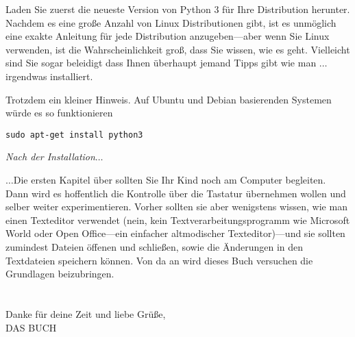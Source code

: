 \begin{LINUX}

\noindent
Laden Sie zuerst die neueste Version von Python 3 für Ihre Distribution herunter. Nachdem es eine große Anzahl von Linux Distributionen gibt, ist es unmöglich eine exakte Anleitung für jede Distribution anzugeben---aber wenn Sie Linux verwenden, ist die Wahrscheinlichkeit groß, dass Sie wissen, wie es geht. Vielleicht sind Sie sogar beleidigt dass Ihnen überhaupt jemand Tipps gibt wie man \texorpdfstring{$\ldots$}{...}irgendwas installiert.

\noindent
Trotzdem ein kleiner Hinweis. Auf Ubuntu und Debian basierenden Systemen würde es so funktionieren

\begin{listing}
\begin{verbatim}
sudo apt-get install python3
\end{verbatim}
\end{listing}
\end{LINUX}

\noindent
\emph{\color{BrickRed}Nach der Installation\texorpdfstring{$\ldots$}{...}}

\noindent
\texorpdfstring{$\ldots$}{...}Die ersten Kapitel über sollten Sie Ihr Kind noch am Computer begleiten. Dann wird es hoffentlich die Kontrolle über die Tastatur übernehmen wollen und selber weiter experimentieren. Vorher sollten sie aber wenigstens wissen, wie man einen Texteditor verwendet (nein, kein Textverarbeitungsprogramm wie Microsoft World oder Open Office---ein einfacher altmodischer Texteditor)---und sie sollten zumindest Dateien öffenen und schließen, sowie die Änderungen in den Textdateien speichern können. Von da an wird dieses Buch versuchen die Grundlagen beizubringen. 
\\
\\
\noindent\\
Danke für deine Zeit und liebe Grüße,
\noindent\\
DAS BUCH
